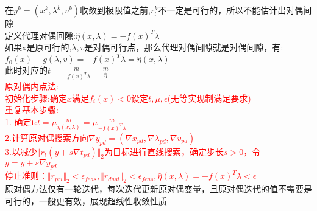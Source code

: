 \documentclass{article}
\begin{document}
在$y^k = (x^k,\lambda ^k,v^k)$收敛到极限值之前,$r_t^k$不一定是可行的，所以不能估计出对偶间隙\\
定义代理对偶间隙:$\hat{\eta}(x,\lambda) = -f(x)^T\lambda$\\
如果x是原可行的,$\lambda,v$是对偶可行点，那么代理对偶间隙就是对偶间隙，有:\\
$f_0(x) - g(\lambda,v) = -f(x)^T\lambda = \hat{\eta}(x,\lambda)$\\
此时对应的$t = \frac{m}{-f(x)^T\lambda} = \frac{m}{\hat{\eta}}$\\
\textcolor{red}{原对偶内点法:\\
初始化步骤:确定$x$满足$f_i(x) < 0$设定$t,\mu,\epsilon$(无等实现制满足要求)\\
重复基本步骤:\\
1. 确定t:$t = \mu \frac{m}{\hat{\eta}(x,\lambda)} = \mu \frac{m}{-f(x)^T\lambda}$\\
2.计算原对偶搜索方向$\nabla y_{pd} = (\nabla x_{pd},\nabla \lambda_{pd},\nabla v_{pd})$\\
3.以减少$\Vert r_t(y+s\nabla t_{pd})\Vert_2$为目标进行直线搜索，确定步长$s>0$，令$y = y + s\nabla y_{pd}$\\
停止准则：$\Vert r_{pri} \Vert_2 < \epsilon_{feas}, \Vert r_{dual} \Vert_2 < \epsilon_{feas},\hat{\eta}(x,\lambda) = -f(x)^T\lambda < \epsilon$}\\
原对偶方法仅有一轮迭代，每次迭代更新原对偶变量，且原对偶迭代的值不需要是可行的，一般更有效，展现超线性收敛性质\\
\end{document}
